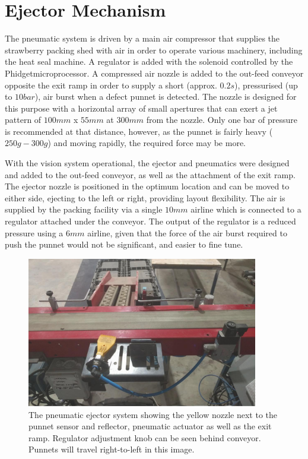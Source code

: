 \documentclass[fleqn,twoside,12pt]{report}
\begin{document}
\section{Ejector Mechanism}


The pneumatic system is driven by a main air compressor that supplies the strawberry packing shed with air in order to operate various machinery, including the heat seal machine. A regulator is added with the solenoid controlled by the Phidget\texttrademark microprocessor. A compressed air nozzle is added to the out-feed conveyor opposite the exit ramp in order to supply a short (approx. $0.2s$), pressurised (up to $10bar$), air burst when a defect punnet is detected. The nozzle is designed for this purpose with a horizontal array of small apertures that can exert a jet pattern of $100mm$ x $55mm$ at $300mm$ from the nozzle. Only one bar of pressure is recommended at that distance, however, as the punnet is fairly heavy ($250g-300g$) and moving rapidly, the required force may be more.

With the vision system operational, the ejector and pneumatics were designed and added to the out-feed conveyor, as well as the attachment of the exit ramp. The ejector nozzle is positioned in the optimum location and can be moved to either side, ejecting to the left or right, providing layout flexibility. The air is supplied by the packing facility via a single $10mm$ airline which is connected to a regulator attached under the conveyor. The output of the regulator is a reduced pressure using a $6mm$ airline, given that the force of the air burst required to push the punnet would not be significant, and easier to fine tune.


\begin{figure}[h]
	\centering
	\includegraphics[width=0.9\textwidth]{ejector.jpg}
	\caption{The pneumatic ejector system showing the yellow nozzle next to the punnet sensor and reflector, pneumatic actuator as well as the exit ramp. Regulator adjustment knob can be seen behind conveyor. Punnets will travel right-to-left in this image.}
	\label{fig:ejector}
\end{figure}
\end{document}
